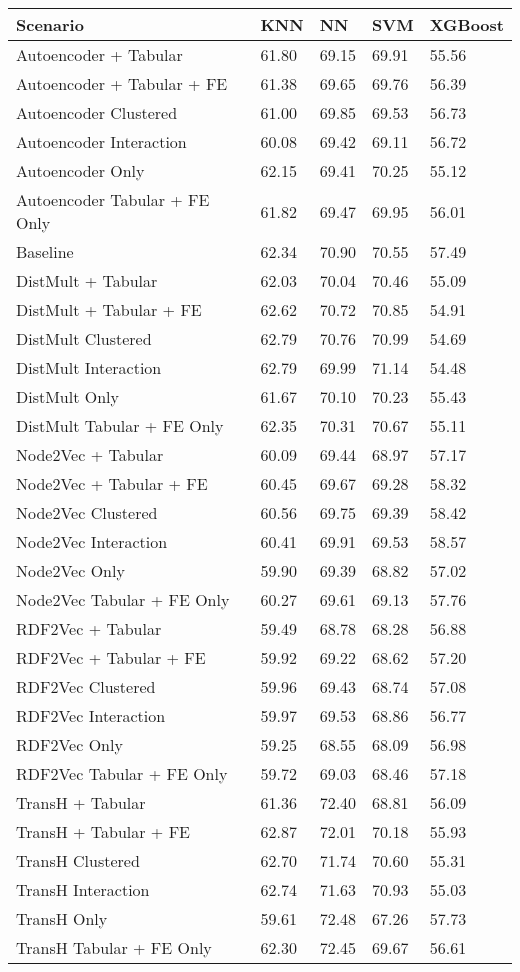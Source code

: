 \begin{tabular}{lllll}
\toprule
Scenario & KNN & NN & SVM & XGBoost \\
\midrule
Autoencoder + Tabular & 61.80 & 69.15 & 69.91 & 55.56 \\
Autoencoder + Tabular + FE & 61.38 & 69.65 & 69.76 & 56.39 \\
Autoencoder Clustered & 61.00 & 69.85 & 69.53 & 56.73 \\
Autoencoder Interaction & 60.08 & 69.42 & 69.11 & 56.72 \\
Autoencoder Only & 62.15 & 69.41 & 70.25 & 55.12 \\
Autoencoder Tabular + FE Only & 61.82 & 69.47 & 69.95 & 56.01 \\
Baseline & 62.34 & 70.90 & 70.55 & 57.49 \\
DistMult + Tabular & 62.03 & 70.04 & 70.46 & 55.09 \\
DistMult + Tabular + FE & 62.62 & 70.72 & 70.85 & 54.91 \\
DistMult Clustered & 62.79 & 70.76 & 70.99 & 54.69 \\
DistMult Interaction & 62.79 & 69.99 & 71.14 & 54.48 \\
DistMult Only & 61.67 & 70.10 & 70.23 & 55.43 \\
DistMult Tabular + FE Only & 62.35 & 70.31 & 70.67 & 55.11 \\
Node2Vec + Tabular & 60.09 & 69.44 & 68.97 & 57.17 \\
Node2Vec + Tabular + FE & 60.45 & 69.67 & 69.28 & 58.32 \\
Node2Vec Clustered & 60.56 & 69.75 & 69.39 & 58.42 \\
Node2Vec Interaction & 60.41 & 69.91 & 69.53 & 58.57 \\
Node2Vec Only & 59.90 & 69.39 & 68.82 & 57.02 \\
Node2Vec Tabular + FE Only & 60.27 & 69.61 & 69.13 & 57.76 \\
RDF2Vec + Tabular & 59.49 & 68.78 & 68.28 & 56.88 \\
RDF2Vec + Tabular + FE & 59.92 & 69.22 & 68.62 & 57.20 \\
RDF2Vec Clustered & 59.96 & 69.43 & 68.74 & 57.08 \\
RDF2Vec Interaction & 59.97 & 69.53 & 68.86 & 56.77 \\
RDF2Vec Only & 59.25 & 68.55 & 68.09 & 56.98 \\
RDF2Vec Tabular + FE Only & 59.72 & 69.03 & 68.46 & 57.18 \\
TransH + Tabular & 61.36 & 72.40 & 68.81 & 56.09 \\
TransH + Tabular + FE & 62.87 & 72.01 & 70.18 & 55.93 \\
TransH Clustered & 62.70 & 71.74 & 70.60 & 55.31 \\
TransH Interaction & 62.74 & 71.63 & 70.93 & 55.03 \\
TransH Only & 59.61 & 72.48 & 67.26 & 57.73 \\
TransH Tabular + FE Only & 62.30 & 72.45 & 69.67 & 56.61 \\
\bottomrule
\end{tabular}
